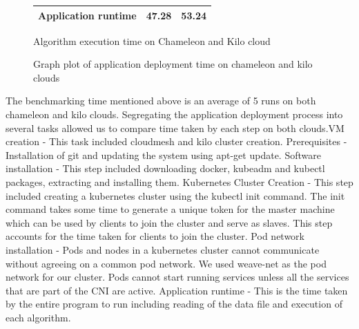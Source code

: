 \documentclass[9pt,twocolumn,twoside]{../../styles/osajnl}
\begin{document}
{\begin{figure}[ht]
\begin{center}
\begin{tabular}{|c | c| c|}
\hline
Application runtime & 47.28 & 53.24\\[1ex]
\hline

\end{tabular}
\end{center}
  \caption{Algorithm execution time on Chameleon and Kilo cloud}
\end{figure}

\begin{figure}[htbp]
\centering
{}
\caption{Graph plot of application deployment time on chameleon and kilo clouds}
\label{Graph plot of application deployment time on chameleon and kilo clouds}
\end{figure}

\noindent
The benchmarking time mentioned above is an average of 5 runs on both
chameleon and kilo clouds. Segregating the application deployment
process into several tasks allowed us to compare time taken by each
step on both clouds.\newline VM creation - This task included
cloudmesh and kilo cluster creation. \newline Prerequisites -
Installation of git and updating the system using apt-get
update. \newline Software installation - This step included
downloading docker, kubeadm and kubectl packages, extracting and
installing them. \newline Kubernetes Cluster Creation - This step
included creating a kubernetes cluster using the kubectl init
command. The init command takes some time to generate a unique token
for the master machine which can be used by clients to join the
cluster and serve as slaves. This step accounts for the time taken for
clients to join the cluster. \newline Pod network installation - Pods
and nodes in a kubernetes cluster cannot communicate without agreeing
on a common pod network. We used weave-net as the pod network for our
cluster. Pods cannot start running services unless all the services
that are part of the CNI are active. \newline Application runtime -
This is the time taken by the entire program to run including reading
of the data file and execution of each algorithm.

}
\end{document}
